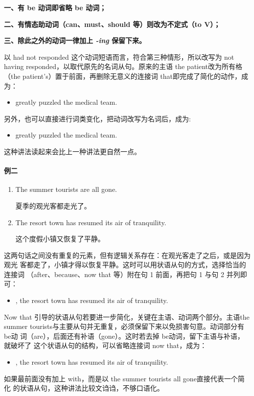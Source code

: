 \textbf{一、有 be 动词即省略 be 动词；}

\textbf{二、有情态助动词（can、must、should 等）则改为不定式（to V）；}

\textbf{三、除此之外的动词一律加上 \emph{-ing} 保留下来。}

以 had not responded 这个动词短语而言，符合第三种情形，所以改写为 not having
responded，以取代原先的名词从句。原来的主语 the patient改为所有格（the
patient's）置于前面，再删除无意义的连接词 that即完成了简化的动作，成为：
\begin{itemize}
\item {}
  greatly puzzled the medical team.
\end{itemize}

另外，也可以直接进行词类变化，把动词改写为名词后，成为:
\begin{itemize}
\item {} greatly
  puzzled the medical team.
\end{itemize}

这种讲法读起来会比上一种讲法更自然一点。

\paragraph{例二}

\begin{enumerate}
\item The summer tourists are all gone.

  夏季的观光客都走光了。
\item The resort town has resumed its air of tranquility.

  这个度假小镇又恢复了平静。
\end{enumerate}

这两句话之间没有重复的元素，但有逻辑关系存在：在观光客走了之后，或是因为观光
客都走了，小镇才得以恢复平静。这时可以用状语从句的方式，选择恰当的连接词
（after、because、now that 等）附在句 1 前面，再把句 1 与句 2 并列即可：
\begin{itemize}
\item {}, the resort town has
  resumed its air of tranquility.
\end{itemize}
Now that 引导的状语从句若要进一步简化，关键在主语、动词两个部分。主语the
summer tourists与主要从句并无重复，必须保留下来以免损害句意。动词部分有 be动
词（are），后面还有补语（gone）。这时若去掉 be动词，留下主语与补语，就破坏了
这个状语从句的结构，可以省略连接词 now that，成为：
\begin{itemize}
\item {}, the resort town has resumed its air of tranquility.
\end{itemize}
如果最前面没有加上 with，而是以 the summer tourists all gone直接代表一个简化
的状语从句，这种讲法比较文诌诌，不够口语化。

